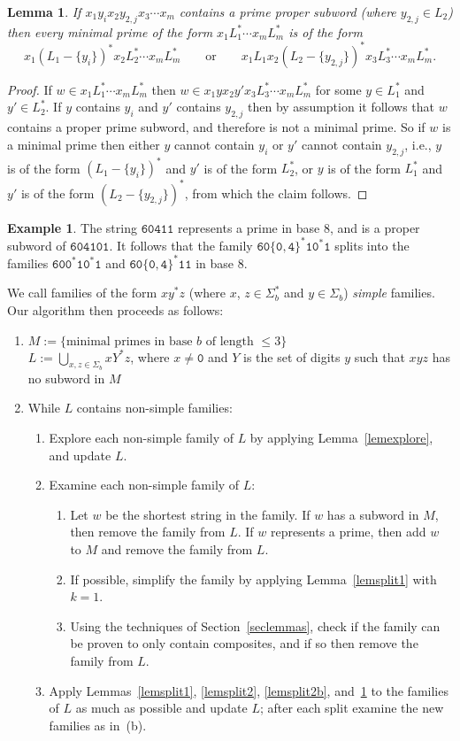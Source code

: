 \documentclass[12pt]{article}
\theoremstyle{plain}
\newtheorem{lemma}[theorem]{Lemma}
\theoremstyle{definition}
\newtheorem{example}[theorem]{Example}
\theoremstyle{remark}
\newcommand{\0}{\mathtt{0}}
\newcommand{\1}{\mathtt{1}}
\newcommand{\2}{\mathtt{2}}
\newcommand{\3}{\mathtt{3}}
\newcommand{\4}{\mathtt{4}}
\newcommand{\5}{\mathtt{5}}
\newcommand{\6}{\mathtt{6}}
\newcommand{\7}{\mathtt{7}}
\newcommand{\8}{\mathtt{8}}
\newcommand{\9}{\mathtt{9}}
\begin{document}
\begin{lemma}\label{lemsplit2c}
If $x_1y_ix_2y_{2,j}x_3\dotsm x_m$ contains a prime proper subword (where $y_{2,j}\in L_2$) then every minimal prime of the form
$x_1L_1^*\dotsm x_mL_m^*$ is of the form
\[x_1(L_1-\{y_i\})^*x_2L_2^*\dotsm x_mL_m^* \qquad\text{or}\qquad x_1L_1x_2(L_2-\{y_{2,j}\})^*x_3L_3^*\dotsm x_mL_m^* . \]
\end{lemma}
\begin{proof}
If $w\in x_1L_1^*\dotsm x_mL_m^*$ then $w\in x_1yx_2y'x_3L_3^*\dotsm x_mL_m^*$ for some $y\in L_1^*$ and $y'\in L_2^*$.
If $y$ contains $y_i$ and $y'$ contains $y_{2,j}$ then by assumption it follows that $w$ contains a proper prime subword,
and therefore is not a minimal prime.  So if $w$ is a minimal prime then either $y$ cannot contain $y_i$ or $y'$ cannot
contain $y_{2,j}$, i.e., $y$ is of the form $(L_1-\{y_i\})^*$ and $y'$ is of the form $L_2^*$, or $y$ is of the form
$L_1^*$ and $y'$ is of the form $(L_2-\{y_{2,j}\})^*$, from which the claim follows.
\end{proof}
\begin{example}
The string $\6\0\4\1\1$ represents a prime in base 8, and is a proper subword of $\6\0\4\1\0\1$.
It follows that the family $\6\0\{\0,\4\}^*\1\0^*\1$ splits into the families
$\6\0\0^*\1\0^*\1$ and $\6\0\{\0,\4\}^*\1\1$ in base 8.
\end{example}

We call families of the form $xy^*z$ (where $x$, $z\in\Sigma_b^*$ and $y\in\Sigma_b$) \emph{simple} families.
Our algorithm then proceeds as follows:
\begin{enumerate}
\item $M:=\{\text{minimal primes in base $b$ of length $\leq3$}\}$ \\
$L:=\bigcup_{x,z\in\Sigma_b}xY^*z$, where $x\neq\0$ and $Y$ is the set of digits $y$ such that $xyz$ has no subword in $M$
\item While $L$ contains non-simple families:
\begin{enumerate}
\item Explore each non-simple family of $L$ by applying Lemma~\ref{lemexplore}, %
and update $L$.
\item Examine each non-simple family of $L$: %
\begin{enumerate}
\item Let $w$ be the shortest string in the family.  If $w$ has a subword in $M$, then remove the family from $L$.
If $w$ represents a prime, then add $w$ to $M$ and remove the family from $L$.
\item If possible, simplify the family by applying Lemma~\ref{lemsplit1} with $k=1$.
\item Using the techniques of Section~\ref{seclemmas}, check if the family can be proven to only contain
composites, and if so then remove the family from $L$.
\end{enumerate}
\item Apply Lemmas~\ref{lemsplit1}, \ref{lemsplit2}, \ref{lemsplit2b}, and~\ref{lemsplit2c} to the families of $L$ as much
as possible and update $L$; after each split examine the new families as in~(b).
\end{enumerate}
\end{enumerate}
\end{document}

